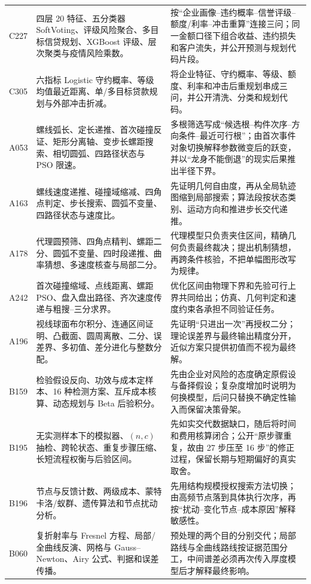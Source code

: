 \documentclass[UTF8,a4paper,12pt]{ctexart}
\begin{document}
\begin{longtable}{p{1.4cm}p{5.2cm}p{7.0cm}}
C227 & 四层 20 特征、五分类器 SoftVoting、评级风险聚合、多目标信贷规划、XGBoost 评级、层次聚类与疫情风险乘数。 &
按“企业画像--违约概率--信誉评级--额度/利率--冲击重算”连接三问；同一金额口径下组合收益、违约损失和客户流失，并公开预测与规划代码片段。\\
C305 & 六指标 Logistic 守约概率、等级均值最近距离、单/多目标贷款规划与外部冲击折减。 &
将企业特征、守约概率、等级、额度、利率和冲击后重规划串成三问，并公开清洗、分类和规划代码。\\
A053 & 螺线弧长、定长递推、首次碰撞反证、矩形分离轴、变步长螺距搜索、相切圆弧、四路径状态与 PSO 限速。 &
多根筛选写成“候选根--构件次序--方向条件--最近可行根”；由首次事件对象切换解释参数微变后的跃变，并以“龙身不能倒退”的现实后果推出半径下界。\\
A163 & 螺线速度递推、碰撞域缩减、四角点判定、步长搜索、圆弧不变量、四路径状态与速度比。 &
先证明几何自由度，再从全局轨迹图缩到局部搜索；算法段按状态类别、运动方向和推进步长交代递推。\\
A178 & 代理圆预筛、四角点精判、螺距二分、圆弧不变量、四时段递推、曲率猜想、多速度核查与局部二分。 &
代理模型只负责夹住区间，精确几何负责最终裁决；提出机制猜想，再跨条件核验，不把单幅图形改写为规律。\\
A242 & 首次碰撞缩域、点线距离、螺距 PSO、盘入盘出路径、齐次速度传递与粗搜--三分求界。 &
优化区间由物理下界和先验可行上界共同给出；仿真、几何判定和速度约束各承担不同验证任务。\\
A196 & 视线球面布尔积分、连通区间证明、凸截面、圆周离散、二分、误差界、多初值、差分进化与整数分配。 &
先证明“只进出一次”再授权二分；理论误差界与最终输出精度分开，近似方案只提供初值而不视为最终解。\\
B159 & 检验假设反向、功效与成本定样本、16 种检测方案、互斥成本核算、动态规划与 Beta 后验积分。 &
先由企业对风险的态度确定原假设与备择假设；复杂度增加时说明为何换模型，后问只替换不确定性输入而保留决策骨架。\\
B195 & 无实测样本下的模拟器、$(n,c)$ 抽检、跨轮状态、重复步骤压缩、长短流程权衡与后验区间。 &
先如实交代数据缺口，随后将时间和费用核算闭合；公开“原步骤重复，故由 27 步压至 16 步”的修正过程，保留长期与短期偏好的真实取舍。\\
B196 & 节点与反馈计数、两级成本、蒙特卡洛/蚁群、遗传算法和节点扰动分析。 &
先用结构规模授权搜索方法切换；由高频节点落到具体执行次序，再按“扰动--变化节点--成本原因”解释敏感性。\\
B060 & 复折射率与 Fresnel 方程、局部/全曲线反演、网格与 Gauss--Newton、Airy 公式、判据和误差传播。 &
预处理的两个目的分别交代；局部路线与全曲线路线按证据范围分工，中间谱差必须再次传入厚度模型后才解释最终影响。\\

\end{longtable}
\end{document}
